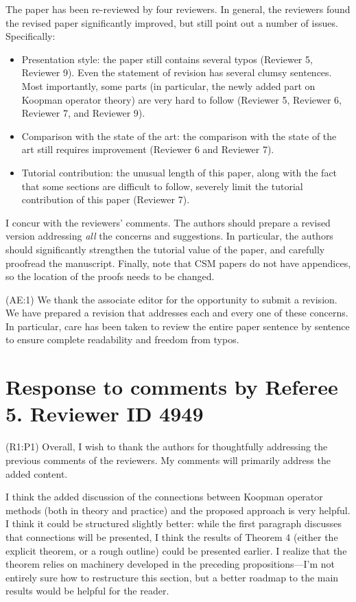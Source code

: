 \documentclass{letter}
\begin{document}
The paper has been re-reviewed by four reviewers. In general, the reviewers found the revised paper significantly improved, but still point out a number of issues. Specifically:
\begin{itemize}
	\item Presentation style: the paper still contains several typos (Reviewer 5, Reviewer 9). Even the statement of revision has several clumsy sentences. Most importantly, some parts (in particular, the newly added	part on Koopman operator theory) are very hard to follow (Reviewer 5, Reviewer 6, Reviewer 7, and Reviewer 9).
	\item Comparison with the state of the art: the comparison with the state of the art still requires improvement (Reviewer 6 and Reviewer 7).
	\item Tutorial contribution: the unusual length of this paper, along with the fact that some sections are difficult to follow, severely limit the tutorial contribution of this paper (Reviewer 7).
\end{itemize}

I concur with the reviewers' comments. The authors should prepare a revised version addressing \emph{all} the concerns and suggestions. In
particular, the authors should significantly strengthen the tutorial value of the paper, and carefully proofread the manuscript. Finally,
note that CSM papers do not have appendices, so the location of the proofs needs to be changed.

{\color{red}(AE:1)} We thank the associate editor for the opportunity to submit a revision.  We have prepared a revision that addresses each and every one of these concerns. In particular, care has been taken to review the entire paper sentence by sentence to ensure complete readability and freedom from typos.


\section{Response to comments by Referee 5. Reviewer ID 4949}

{\color{red}(R1:P1)} Overall, I wish to thank the authors for thoughtfully addressing the previous comments of the reviewers. My comments will primarily address the added content. 

I think the added discussion of the connections between Koopman operator methods (both in theory and practice) and the proposed approach is very helpful. I think it could be structured slightly better: while the first paragraph discusses that connections will be presented, I think the results of Theorem 4 (either the explicit theorem, or a rough outline) could be presented earlier. I realize that the theorem relies on machinery developed in the preceding propositions---I'm not entirely sure how to restructure this section, but a better roadmap to the main results would be helpful for the reader. 
\end{document}
